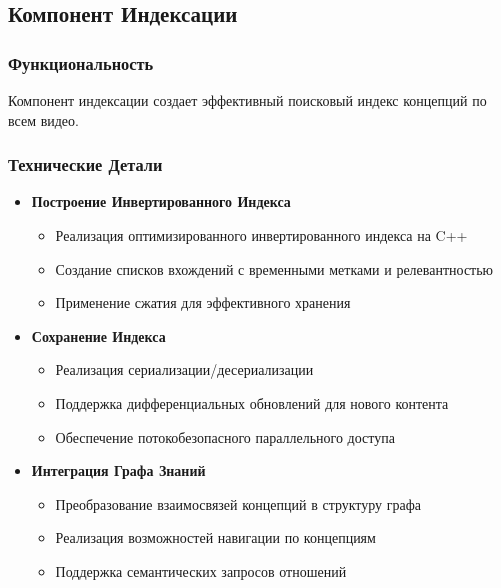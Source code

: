 \documentclass[12pt,a4paper]{article}
\begin{document}
\subsection{Компонент Индексации}

\subsubsection{Функциональность}
Компонент индексации создает эффективный поисковый индекс концепций по всем видео.

\subsubsection{Технические Детали}
\begin{itemize}
    \item \textbf{Построение Инвертированного Индекса}
    \begin{itemize}
        \item Реализация оптимизированного инвертированного индекса на C++
        \item Создание списков вхождений с временными метками и релевантностью
        \item Применение сжатия для эффективного хранения
    \end{itemize}

    \item \textbf{Сохранение Индекса}
    \begin{itemize}
        \item Реализация сериализации/десериализации
        \item Поддержка дифференциальных обновлений для нового контента
        \item Обеспечение потокобезопасного параллельного доступа
    \end{itemize}

    \item \textbf{Интеграция Графа Знаний}
    \begin{itemize}
        \item Преобразование взаимосвязей концепций в структуру графа
        \item Реализация возможностей навигации по концепциям
        \item Поддержка семантических запросов отношений
    \end{itemize}
\end{itemize}
\end{document}

